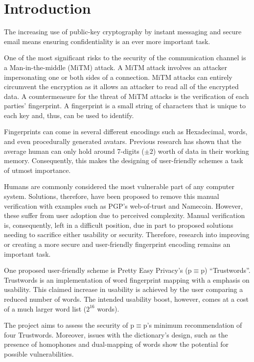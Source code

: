 \section{Introduction}

The increasing use of public-key cryptography by instant messaging and secure email means ensuring confidentiality is an ever more important task.

One of the most significant risks to the security of the communication channel is a Man-in-the-middle (MiTM) attack. A MiTM attack involves an attacker impersonating one or both sides of a connection. MiTM attacks can entirely circumvent the encryption as it allows an attacker to read all of the encrypted data. A countermeasure for the threat of MiTM attacks is the verification of each parties’ fingerprint. A fingerprint is a small string of characters that is unique to each key and, thus, can be used to identify.

Fingerprints can come in several different encodings such as Hexadecimal, words, and even procedurally generated avatars. Previous research has shown that the average human can only hold around 7-digits ($\pm 2$) worth of data in their working memory\cite{miller1956magical}. Consequently, this makes the designing of user-friendly schemes a task of utmost importance.

Humans are commonly considered the most vulnerable part of any computer system. Solutions, therefore, have been proposed to remove this manual verification with examples such as PGP's web-of-trust\cite{callas1998openpgp} and Namecoin\cite{kalodner2015empirical}. However, these suffer from user adoption due to perceived complexity. Manual verification is, consequently, left in a difficult position, due in part to proposed solutions needing to sacrifice either usability or security. Therefore, research into improving or creating a more secure and user-friendly fingerprint encoding remains an important task.

One proposed user-friendly scheme is Pretty Easy Privacy's (p$\equiv$p) ``Trustwords''. Trustwords is an implementation of word fingerprint mapping with a emphasis on usability. This claimed increase in usability is achieved by the user comparing a reduced number of words. The intended usability boost, however, comes at a cost of a much larger word list ($2^{16}$ words). 

The project aims to assess the security of p$\equiv$p’s minimum recommendation of four Trustwords\cite{trustwordsHandshake}. Moreover, issues with the dictionary's design, such as the presence of homophones and dual-mapping of words show the potential for possible vulnerabilities.